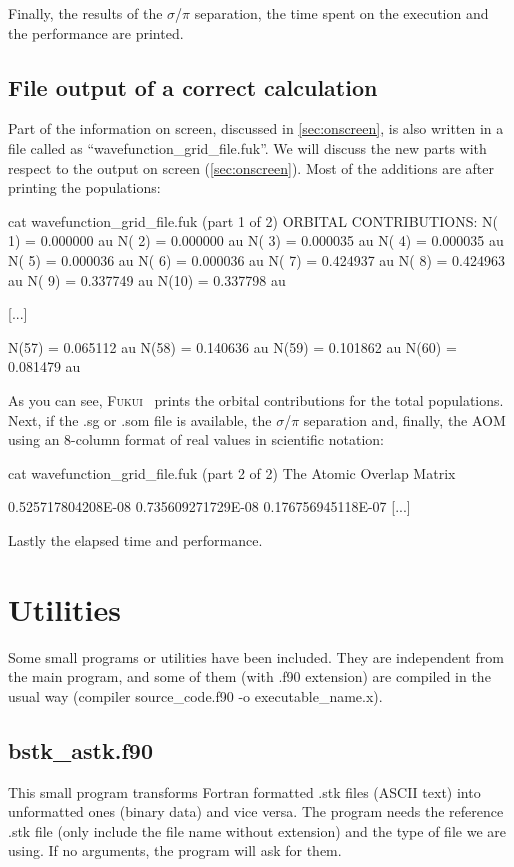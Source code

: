 \documentclass[a4paper,11pt,openany]{memoir}
\newcommand\programa{\textsc{Fukui}}
\begin{document}
Finally, the results of the $\sigma$/$\pi$ separation, the time spent on the execution and the performance are printed.

\section{File output of a correct calculation}\label{sec:file}
Part of the information on screen, discussed in \autoref{sec:onscreen}, is also written in a file called as ``wavefunction\_grid\_file.fuk''. We will discuss the new parts with respect to the output on screen (\autoref{sec:onscreen}). Most of the additions are after printing the populations:
\begin{consola}{cat wavefunction\_grid\_file.fuk (part 1 of 2)}
    ORBITAL CONTRIBUTIONS:
     N( 1) =     0.000000 au
     N( 2) =     0.000000 au
     N( 3) =     0.000035 au
     N( 4) =     0.000035 au
     N( 5) =     0.000036 au
     N( 6) =     0.000036 au
     N( 7) =     0.424937 au
     N( 8) =     0.424963 au
     N( 9) =     0.337749 au
     N(10) =     0.337798 au

[...]

     N(57) =     0.065112 au
     N(58) =     0.140636 au
     N(59) =     0.101862 au
     N(60) =     0.081479 au
\end{consola}
As you can see, \programa~ prints the orbital contributions for the total populations. Next, if the .sg or .som file is available, the $\sigma$/$\pi$ separation and, finally, the \ac{AOM} using an 8-column format of real values in scientific notation:
\begin{consola}{cat wavefunction\_grid\_file.fuk (part 2 of 2)}
          The Atomic Overlap Matrix



   0.525717804208E-08
   0.735609271729E-08  0.176756945118E-07
[...]
\end{consola}
Lastly the elapsed time and performance.

\chapter{Utilities}
Some small programs or utilities have been included. They are independent from the main program, and some of them (with .f90 extension) are compiled in the usual way (compiler source\_code.f90 -o executable\_name.x).

\section{bstk\_astk.f90}
This small program transforms Fortran formatted .stk files (ASCII text) into unformatted ones (binary data) and vice versa. The program needs the reference .stk file (only include the file name without extension) and the type of file we are using. If no arguments, the program will ask for them.
\end{document}

